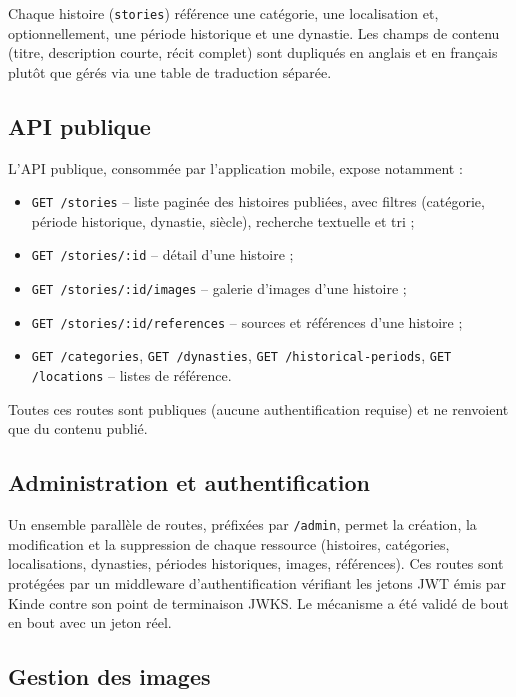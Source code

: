 \documentclass[11pt,a4paper]{article}
\begin{document}
Chaque histoire (\texttt{stories}) référence une catégorie, une localisation et, optionnellement, une période historique et une dynastie. Les champs de contenu (titre, description courte, récit complet) sont dupliqués en anglais et en français plutôt que gérés via une table de traduction séparée.

\subsection{API publique}

L'API publique, consommée par l'application mobile, expose notamment :

\begin{itemize}[nosep]
    \item \texttt{GET /stories} -- liste paginée des histoires publiées, avec filtres (catégorie, période historique, dynastie, siècle), recherche textuelle et tri ;
    \item \texttt{GET /stories/:id} -- détail d'une histoire ;
    \item \texttt{GET /stories/:id/images} -- galerie d'images d'une histoire ;
    \item \texttt{GET /stories/:id/references} -- sources et références d'une histoire ;
    \item \texttt{GET /categories}, \texttt{GET /dynasties}, \texttt{GET /historical-periods}, \texttt{GET /locations} -- listes de référence.
\end{itemize}

Toutes ces routes sont publiques (aucune authentification requise) et ne renvoient que du contenu publié.

\subsection{Administration et authentification}

Un ensemble parallèle de routes, préfixées par \texttt{/admin}, permet la création, la modification et la suppression de chaque ressource (histoires, catégories, localisations, dynasties, périodes historiques, images, références). Ces routes sont protégées par un middleware d'authentification vérifiant les jetons JWT émis par Kinde contre son point de terminaison JWKS. Le mécanisme a été validé de bout en bout avec un jeton réel.

\subsection{Gestion des images}
\end{document}

